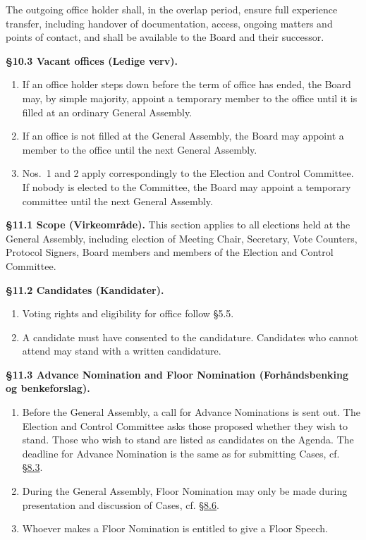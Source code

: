 \documentclass{../../../Common/Latex/Templates/rapport}
\begin{document}
The outgoing office holder shall, in the overlap period, ensure full experience transfer, including handover of documentation, access, ongoing matters and points of contact, and shall be available to the Board and their successor.

\textbf{\S 10.3 Vacant offices (Ledige verv).}\label{bylaw:10.3}
\begin{enumerate}
  \item If an office holder steps down before the term of office has ended, the Board may, by simple majority, appoint a temporary member to the office until it is filled at an ordinary General Assembly.
  \item If an office is not filled at the General Assembly, the Board may appoint a member to the office until the next General Assembly.
  \item Nos.\ 1 and 2 apply correspondingly to the Election and Control Committee. If nobody is elected to the Committee, the Board may appoint a temporary committee until the next General Assembly.
\end{enumerate}

\label{bylaw:11}
\textbf{\S 11.1 Scope (Virkeområde).}\label{bylaw:11.1} This section applies to all elections held at the General Assembly, including election of Meeting Chair, Secretary, Vote Counters, Protocol Signers, Board members and members of the Election and Control Committee.

\textbf{\S 11.2 Candidates (Kandidater).}\label{bylaw:11.2}
\begin{enumerate}
  \item Voting rights and eligibility for office follow \S5.5.
  \item A candidate must have consented to the candidature. Candidates who cannot attend may stand with a written candidature.
\end{enumerate}

\textbf{\S 11.3 Advance Nomination and Floor Nomination (Forhåndsbenking og benkeforslag).}\label{bylaw:11.3}
\begin{enumerate}
  \item Before the General Assembly, a call for Advance Nominations is sent out. The Election and Control Committee asks those proposed whether they wish to stand. Those who wish to stand are listed as candidates on the Agenda. The deadline for Advance Nomination is the same as for submitting Cases, cf. \hyperref[bylaw:8.3]{\S 8.3}.
  \item During the General Assembly, Floor Nomination may only be made during presentation and discussion of Cases, cf. \hyperref[bylaw:8.6]{\S 8.6}.
  \item Whoever makes a Floor Nomination is entitled to give a Floor Speech.
\end{enumerate}
\end{document}
